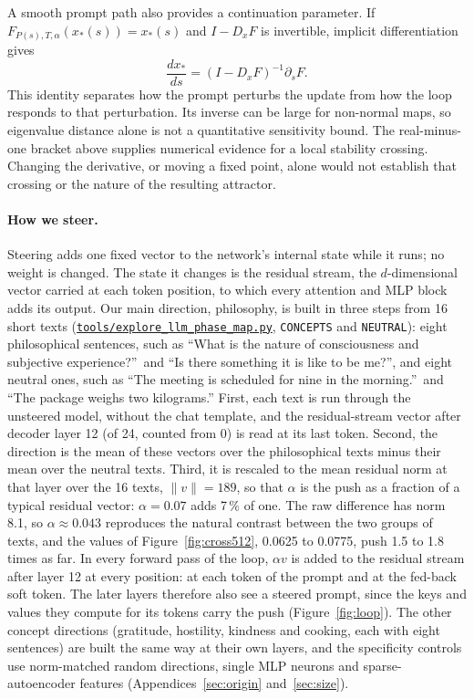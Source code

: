 \documentclass[11pt,letterpaper]{article}
\newcommand{\repourl}{https://github.com/tdj28/neural-shrimp}
\newcommand{\reporef}{arxiv-v1}
\newcommand{\repo}[1]{\href{\repourl/blob/\reporef/#1}{\nolinkurl{#1}}}
\begin{document}
A smooth prompt path also provides a continuation parameter. If
$F_{P(s),T,\alpha}(x_*(s))=x_*(s)$ and $I-D_xF$ is invertible, implicit
differentiation gives
\begin{equation}
 \frac{dx_*}{ds}=(I-D_xF)^{-1}\partial_s F.
\end{equation}
This identity separates how the prompt perturbs the update from how the loop
responds to that perturbation. Its inverse can be large for non-normal maps,
so eigenvalue distance alone is not a quantitative sensitivity bound. The real-minus-one bracket above supplies numerical evidence for a local
stability crossing. Changing the derivative, or moving a fixed point, alone
would not establish that crossing or the nature of the resulting attractor.

\paragraph{How we steer.} Steering adds one fixed vector to the network's internal state while it runs; no weight is
changed. The state it changes is the residual stream, the $d$-dimensional vector carried at each token position, to
which every attention and MLP block adds its output. Our main direction, philosophy, is built in three steps from 16
short texts (\repo{tools/explore_llm_phase_map.py}, \texttt{CONCEPTS} and \texttt{NEUTRAL}): eight philosophical
sentences, such as ``What is the nature of consciousness and subjective experience?''\ and ``Is there something it is
like to be me?'', and eight neutral ones, such as ``The meeting is scheduled for nine in the morning.''\ and ``The
package weighs two kilograms.'' First, each text is run through the unsteered model, without the chat template, and the
residual-stream vector after decoder layer 12 (of 24, counted from 0) is read at its last token. Second, the direction
is the mean of these vectors over the philosophical texts minus their mean over the neutral texts. Third, it is
rescaled to the mean residual norm at that layer over the 16 texts, $\lVert v\rVert=189$, so that $\alpha$ is the push
as a fraction of a typical residual vector: $\alpha=0.07$ adds 7\,\% of one. The raw difference has norm 8.1, so
$\alpha\approx0.043$ reproduces the natural contrast between the two groups of texts, and the values of
Figure~\ref{fig:cross512}, 0.0625 to 0.0775, push 1.5 to 1.8 times as far. In every forward pass of the loop, $\alpha v$ is added to the residual stream after layer 12 at every position: at
each token of the prompt and at the fed-back soft token. The later layers therefore also see a steered prompt, since
the keys and values they compute for its tokens carry the push (Figure~\ref{fig:loop}). The other
concept directions (gratitude, hostility, kindness and cooking, each with eight sentences) are built the same way at
their own layers, and the specificity controls use norm-matched random directions, single MLP neurons and
sparse-autoencoder features (Appendices~\ref{sec:origin} and~\ref{sec:size}).
\end{document}
